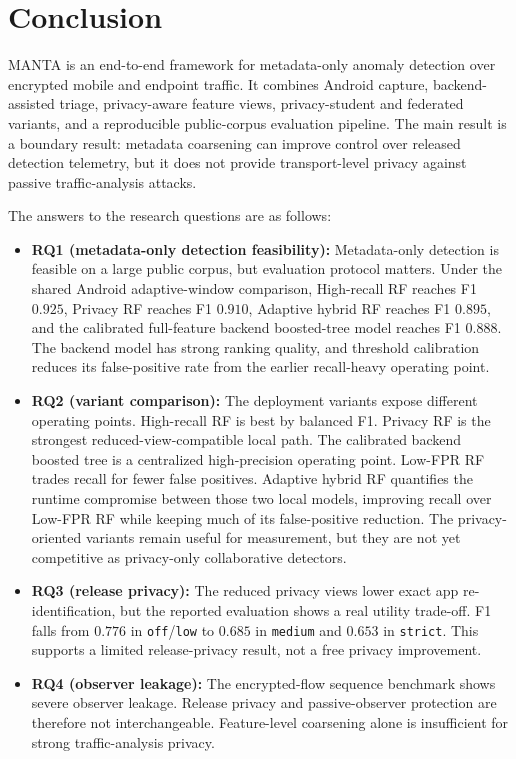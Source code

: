 \section{Conclusion}
MANTA is an end-to-end framework for metadata-only anomaly detection over encrypted mobile and
endpoint traffic. It combines Android capture, backend-assisted triage, privacy-aware feature views,
privacy-student and federated variants, and a reproducible public-corpus evaluation pipeline. The
main result is a boundary result: metadata coarsening can improve control over released detection
telemetry, but it does not provide transport-level privacy against passive traffic-analysis attacks.

The answers to the research questions are as follows:
\begin{itemize}[leftmargin=*]
  \item \textbf{RQ1 (metadata-only detection feasibility):} Metadata-only detection is feasible on
  a large public corpus, but evaluation protocol matters. Under the shared Android adaptive-window
  comparison, High-recall RF reaches F1 \(0.925\), Privacy RF reaches F1 \(0.910\), Adaptive hybrid
  RF reaches F1 \(0.895\), and the calibrated full-feature backend boosted-tree model reaches F1
  \(0.888\). The backend model has
  strong ranking quality, and threshold calibration reduces its false-positive rate from the earlier
  recall-heavy operating point.
  \item \textbf{RQ2 (variant comparison):} The deployment variants expose different operating
  points. High-recall RF is best by balanced F1. Privacy RF is the strongest reduced-view-compatible
  local path. The calibrated backend boosted tree is a centralized high-precision operating point.
  Low-FPR RF trades recall for fewer false positives. Adaptive hybrid RF quantifies the runtime
  compromise between those two local models, improving recall over Low-FPR RF while keeping much of
  its false-positive reduction. The privacy-oriented variants remain useful for measurement, but
  they are not yet competitive as privacy-only collaborative detectors.
  \item \textbf{RQ3 (release privacy):} The reduced privacy views lower exact app re-identification, but
  the reported evaluation shows a real utility trade-off. F1 falls from \(0.776\) in
  \texttt{off}/\texttt{low} to \(0.685\) in \texttt{medium} and \(0.653\) in \texttt{strict}. This
  supports a limited release-privacy result, not a free privacy improvement.
  \item \textbf{RQ4 (observer leakage):} The encrypted-flow sequence benchmark shows severe
  observer leakage. Release privacy and passive-observer protection are therefore not
  interchangeable. Feature-level coarsening alone is insufficient for strong traffic-analysis
  privacy.
\end{itemize}

